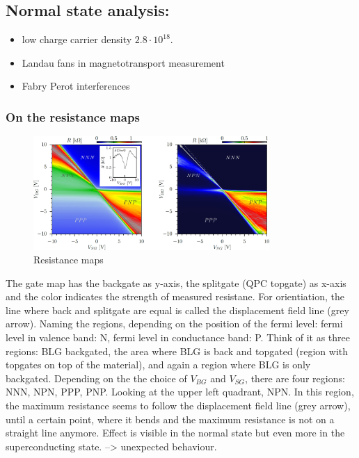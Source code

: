 \subsection*{Normal state analysis:}
\begin{itemize}
\item low charge carrier density $2.8\cdot 10^{18}$.
\item Landau fans in magnetotransport measurement
\item Fabry Perot interferences
\end{itemize}

\subsubsection*{On the resistance maps}
\begin{figure}
\centering
\includegraphics[width=0.8\textwidth]{figure/experiment/resistance-map-edit}
\caption{Resistance maps}
\end{figure}

 The gate map has the backgate as y-axis, the splitgate (QPC topgate) as x-axis and the color indicates the strength of measured resistane. For orientiation, the line where back and splitgate are equal is called the displacement field line (grey arrow). Naming the regions, depending on the position of the fermi level: fermi level in valence band: N, fermi level in conductance band: P. Think of it as three regions: BLG backgated, the area where BLG is back and topgated (region with topgates on top of the material), and again a region where BLG is only backgated. Depending on the the choice of $V_{BG}$ and $V_{SG}$, there are four regions: NNN, NPN, PPP, PNP. Looking at the upper left quadrant, NPN. In this region, the maximum resistance seems to follow the displacement field line (grey arrow), until a certain point, where it bends and the maximum resistance is not on a straight line anymore. Effect is visible in the normal state but even more in the superconducting state. --> unexpected behaviour.
 
